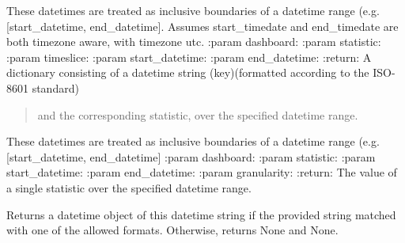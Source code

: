 \documentclass[letterpaper,10pt,english]{sphinxmanual}
\begin{document}

\begin{fulllineitems}
\label{\detokenize{pydash_web.controller.dashboards:pydash_web.controller.dashboards.handle_statistic_per_timeslice}}
These datetimes are treated as inclusive boundaries of a datetime range (e.g. {[}start\_datetime, end\_datetime{]}.
Assumes start\_timedate and end\_timedate are both timezone aware, with timezone utc.
:param dashboard:
:param statistic:
:param timeslice:
:param start\_datetime:
:param end\_datetime:
:return: A dictionary consisting of a datetime string (key)(formatted according to the ISO-8601 standard)
\begin{quote}

and the corresponding statistic, over the specified datetime range.
\end{quote}

\end{fulllineitems}


\begin{fulllineitems}
\label{\detokenize{pydash_web.controller.dashboards:pydash_web.controller.dashboards.handle_statistic_without_timeslice}}
These datetimes are treated as inclusive boundaries of a datetime range (e.g. {[}start\_datetime, end\_datetime{]}
:param dashboard:
:param statistic:
:param start\_datetime:
:param end\_datetime:
:param granularity:
:return: The value of a single statistic over the specified datetime range.

\end{fulllineitems}


\begin{fulllineitems}
\label{\detokenize{pydash_web.controller.dashboards:pydash_web.controller.dashboards.match_datetime_string_with_formats}}
Returns a datetime object of this datetime string if the provided string matched with
one of the allowed formats. Otherwise, returns None and None.

\end{fulllineitems}
\end{document}
